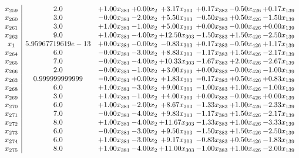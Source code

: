 \documentclass[8pt]{article}
\begin{document}
\[\begin{array}{c| c c@{\hskip 2pt} c@{\hskip 2pt} c@{\hskip 2pt} c@{\hskip 2pt} c@{\hskip 2pt} c@{\hskip 2pt} }
 x_{259}   &  2.0 & +  1.00 x_{381} & +  0.00 x_{2} & +  3.17 x_{303} & +  0.17 x_{383} & -0.50 x_{426} & +  0.17 x_{139}\\
 x_{260}   &  3.0 & -0.00 x_{381} & -2.00 x_{2} & +  5.50 x_{303} & -0.50 x_{383} & +  0.50 x_{426} & -1.50 x_{139}\\
 x_{261}   &  3.0 & +  1.00 x_{381} & -1.00 x_{2} & +  5.00 x_{303} & +  0.00 x_{383} & -0.00 x_{426} & +  0.00 x_{139}\\
 x_{262}   &  9.0 & +  1.00 x_{381} & -4.00 x_{2} & + 12.50 x_{303} & -1.50 x_{383} & +  1.50 x_{426} & -2.50 x_{139}\\
 x_{1}   &  5.95967719619e-13 & +  0.00 x_{381} & -0.00 x_{2} & -0.83 x_{303} & +  0.17 x_{383} & -0.50 x_{426} & +  1.17 x_{139}\\
 x_{264}   &  6.0 & -0.00 x_{381} & -3.00 x_{2} & +  8.83 x_{303} & -1.17 x_{383} & +  1.50 x_{426} & -2.17 x_{139}\\
 x_{265}   &  7.0 & -0.00 x_{381} & -4.00 x_{2} & + 10.33 x_{303} & -1.67 x_{383} & +  2.00 x_{426} & -2.67 x_{139}\\
 x_{266}   &  2.0 & -0.00 x_{381} & -1.00 x_{2} & +  3.00 x_{303} & +  0.00 x_{383} & -0.00 x_{426} & -1.00 x_{139}\\
 x_{263}   &  0.999999999999 & -0.00 x_{381} & +  0.00 x_{2} & +  1.83 x_{303} & -0.17 x_{383} & +  0.50 x_{426} & +  0.83 x_{139}\\
 x_{268}   &  6.0 & +  1.00 x_{381} & -3.00 x_{2} & +  9.00 x_{303} & -1.00 x_{383} & +  1.00 x_{426} & -1.00 x_{139}\\
 x_{269}   &  3.0 & +  1.00 x_{381} & -1.00 x_{2} & +  4.00 x_{303} & +  0.00 x_{383} & -0.00 x_{426} & +  0.00 x_{139}\\
 x_{270}   &  6.0 & +  1.00 x_{381} & -2.00 x_{2} & +  8.67 x_{303} & -1.33 x_{383} & +  1.00 x_{426} & -2.33 x_{139}\\
 x_{271}   &  7.0 & -0.00 x_{381} & -4.00 x_{2} & +  9.83 x_{303} & -1.17 x_{383} & +  1.50 x_{426} & -2.17 x_{139}\\
 x_{272}   &  8.0 & +  1.00 x_{381} & -4.00 x_{2} & + 11.67 x_{303} & -1.33 x_{383} & +  1.00 x_{426} & -3.33 x_{139}\\
 x_{273}   &  6.0 & -0.00 x_{381} & -3.00 x_{2} & +  9.50 x_{303} & -1.50 x_{383} & +  1.50 x_{426} & -2.50 x_{139}\\
 x_{274}   &  6.0 & +  1.00 x_{381} & -3.00 x_{2} & +  9.17 x_{303} & -0.83 x_{383} & +  0.50 x_{426} & -1.83 x_{139}\\
 x_{275}   &  8.0 & +  1.00 x_{381} & -4.00 x_{2} & + 11.00 x_{303} & -1.00 x_{383} & +  1.00 x_{426} & -2.00 x_{139}\\

\end{array}\]
\end{document}

